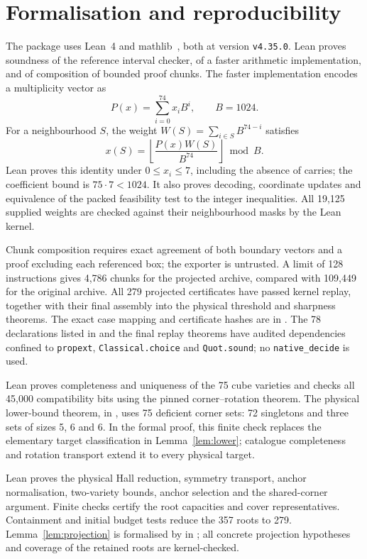 \documentclass[11pt]{article}
\theoremstyle{remark}
\begin{document}
\section{Formalisation and reproducibility}\label{sec:formal}
The package uses Lean~4 and mathlib~\cite{Lean4,mathlib}, both at version
\texttt{v4.35.0}. Lean proves soundness of the reference interval checker,
of a faster arithmetic implementation, and of composition of bounded proof
chunks. The faster implementation encodes a multiplicity vector as
\[
 P(x)=\sum_{i=0}^{74}x_i B^i,\qquad B=1024.
\]
For a neighbourhood $S$, the weight $W(S)=\sum_{i\in S}B^{74-i}$ satisfies
\[
 x(S)=\left\lfloor\frac{P(x)W(S)}{B^{74}}\right\rfloor\bmod B.
\]
Lean proves this identity under $0\le x_i\le7$, including the absence of
carries; the coefficient bound is $75\cdot7<1024$. It also proves decoding,
coordinate updates and equivalence of the packed feasibility test to the
integer inequalities. All 19,125 supplied weights are checked against their
neighbourhood masks by the Lean kernel.

Chunk composition requires exact agreement of both boundary vectors and a
proof excluding each referenced box; the exporter is untrusted. A limit of
128 instructions gives 4,786 chunks for the projected archive, compared with
109,449 for the original archive. All 279 projected certificates have passed
kernel replay, together with their final assembly into the physical threshold
and sharpness theorems. The exact case mapping and certificate hashes are in
.
The 78 declarations listed in  and the final replay theorems
have audited dependencies confined to \texttt{propext},
\texttt{Classical.choice} and \texttt{Quot.sound}; no
\texttt{native\_decide} is used.

Lean proves completeness and uniqueness of the 75 cube varieties and checks
all 45,000 compatibility bits using the pinned corner--rotation theorem.
The physical lower-bound theorem,  in
, uses 75 deficient corner sets: 72 singletons
and three sets of sizes 5, 6 and 6. In the formal proof, this finite check replaces the
elementary target classification in Lemma~\ref{lem:lower}; catalogue completeness and rotation
transport extend it to every physical target.

Lean proves the physical Hall reduction, symmetry transport, anchor
normalisation, two-variety bounds, anchor selection and the shared-corner
argument. Finite checks certify the root capacities and cover representatives.
Containment and initial budget tests reduce the 357 roots to 279.
Lemma~\ref{lem:projection} is formalised by
 in
; all concrete projection hypotheses
and coverage of the retained roots are kernel-checked.
\end{document}
